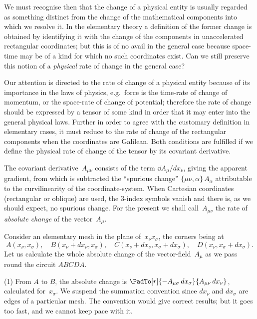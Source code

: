 \documentclass[12pt]{book}
\begin{document}
We must recognise then that the change of a physical entity is usually
regarded as something distinct from the change of the mathematical components
into which we resolve it. In the elementary theory a definition of the
former change is obtained by identifying it with the change of the components
in unaccelerated rectangular coordinates; but this is of no avail in the general
case because space-time may be of a kind for which no such coordinates exist.
Can we still preserve this notion of a \emph{physical} rate of change in the general
case?

Our attention is directed to the rate of change of a physical entity because
of its importance in the laws of physics, e.g.\ force is the time-rate of change
of momentum, or the space-rate of change of potential; therefore the rate of
change should be expressed by a tensor of some kind in order that it may enter
into the general physical laws. Further in order to agree with the customary
definition in elementary cases, it must reduce to the rate of change of the
rectangular components when the coordinates are Galilean. Both conditions
are fulfilled if we define the physical rate of change of the tensor by its covariant
derivative.

The covariant derivative~$A_{\mu\nu}$ consists of the term $\dd A_{\mu}/dx_{\nu}$, giving the
apparent gradient, from which is subtracted the ``spurious change'' $\{\mu\nu, \alpha\}\, A_{\alpha}$
attributable to the curvilinearity of the coordinate\hyp{}system. When Cartesian
coordinates (rectangular or oblique) are used, the $3$-index symbols vanish and
there is, as we should expect, no spurious change. For the present we shall
call~$A_{\mu\nu}$ the rate of \emph{absolute change} of the vector~$A_{\mu}$.
%

Consider an elementary mesh in the plane of~$x_{\nu} x_{\sigma}$, the corners being at
\[
A(x_{\nu}, x_{\sigma}),\quad B(x_{\nu} + dx_{\nu}, x_{\sigma}),\quad
C(x_{\nu} + dx_{\nu}, x_{\sigma} + dx_{\sigma}),\quad D(x_{\nu}, x_{\sigma} + dx_{\sigma}).
\]
Let us calculate the whole absolute change of the vector\hyp{}field~$A_{\mu}$ as we pass
round the circuit $ABCDA$.

(1) From $A$ to $B$, the absolute change is $\PadTo[r]{-A_{\mu\sigma}\, dx_{\sigma}}{A_{\mu\nu}\, dx_{\nu}}$, calculated for~$x_{\sigma}$\footnotemark.\footnotetext
  {We suspend the summation convention since $dx_{\nu}$ and $dx_{\sigma}$ are edges of a particular mesh.
  The convention would give correct results; but it goes too fast, and we cannot keep pace with it.}%
\end{document}
